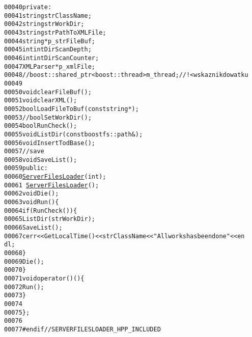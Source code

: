 \begin{footnotesize}
\begin{alltt}
00040     \textcolor{keyword}{private}:
00041         \textcolor{keywordtype}{string} strClassName;
00042         \textcolor{keywordtype}{string} strWorkDir;
00043         \textcolor{keywordtype}{string} strPathToXMLFile;
00044         \textcolor{keywordtype}{string} *p\_strFileBuf;
00045         \textcolor{keywordtype}{int} intDirScanDepth;
00046         \textcolor{keywordtype}{int} intDirScanCounter;
00047         XMLParser *p\_xmlFile;
00048         \textcolor{comment}{//boost::shared\_ptr<boost::thread> m\_thread;//!<wskaznik do watku}
00049 
00050         \textcolor{keywordtype}{void} clearFileBuf();
00051         \textcolor{keywordtype}{void} clearXML();
00052         \textcolor{keywordtype}{bool} LoadFileToBuf(\textcolor{keyword}{const} \textcolor{keywordtype}{string}*);
00053         \textcolor{comment}{//bool SetWorkDir();}
00054         \textcolor{keywordtype}{bool} RunCheck();
00055         \textcolor{keywordtype}{void} ListDir(\textcolor{keyword}{const} boostfs::path &);
00056         \textcolor{keywordtype}{void} InsertTodBase();
00057         \textcolor{comment}{//save}
00058         \textcolor{keywordtype}{void} SaveList();
00059     \textcolor{keyword}{public}:
00060         \hyperlink{classServerFilesLoader_a663068c34adbc6f88781b2caac5cb14e}{ServerFilesLoader}(\textcolor{keywordtype}{int});
00061         ~\hyperlink{classServerFilesLoader}{ServerFilesLoader}();
00062         \textcolor{keywordtype}{void} Die();
00063         \textcolor{keywordtype}{void} Run()\{
00064             \textcolor{keywordflow}{if}(RunCheck())\{
00065                 ListDir( strWorkDir );
00066                 SaveList();
00067                 cerr<<GetLocalTime()<<strClassName<<\textcolor{stringliteral}{"All works has been done"}<<en
      dl;
00068             \}
00069             Die();
00070         \}
00071         \textcolor{keywordtype}{void} operator()()\{
00072             Run();
00073         \}
00074 
00075 \};
00076 
00077 \textcolor{preprocessor}{#endif // SERVERFILESLOADER\_HPP\_INCLUDED}
\end{alltt}\end{footnotesize}

